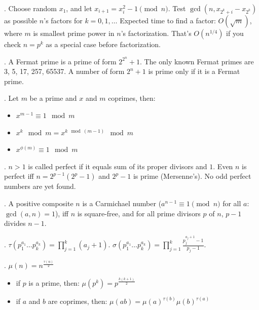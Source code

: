 .
Choose random $x_1$, and let $x_{i+1} = x_i^2 - 1 \pmod{n}$.
Test $\gcd(n, x_{2^k+i} - x_{2^k})$ as possible $n$'s factors for $k=0,1,\ldots$
Expected time to find a factor: $O(\sqrt{m})$, where $m$ is smallest
prime power in $n$'s factorization.
That's $O(n^{1/4})$ if you check $n = p^k$ as a special case before factorization.

.  A Fermat prime is a prime of form $2^{2^n}+1$.
The only known Fermat primes are 3, 5, 17, 257, 65537.
A number of form $2^n+1$ is prime only if it is a Fermat prime.


. Let $m$ be a prime and $x$ and $m$ coprimes, then:
\begin{itemize}
\item $x^{m-1} \equiv 1 \mod m $
\item $x^{k} \mod m = x^{k \mod (m-1)} \mod m$
\item $x^{\phi(m)} \equiv 1 \mod m $
\end{itemize}


.  $n>1$ is called perfect if it equals
sum of its proper divisors and $1$.  Even $n$ is perfect iff $n = 2^{p-1} (2^p - 1)$
and $2^p - 1$ is prime (Mersenne's). No odd perfect numbers are yet found.

.
A positive composite $n$ is a Carmichael number
($a^{n-1} \equiv 1 \pmod{n}$ for all $a$: $\gcd(a,n)=1$),
iff $n$ is square-free, and for all prime divisors $p$ of $n$, $p-1$ divides $n-1$.

.
$\tau(p_1^{a_1} \dots p_k^{a_k}) = \prod_{j=1}^k (a_j+1)$. \quad
$\sigma(p_1^{a_1} \dots p_k^{a_k}) = \prod_{j=1}^k \frac{p_j^{a_j+1}-1}{p_j-1}$.

.
$\mu(n) = n^{\frac{\tau(n)}{2}}$
\begin{itemize}
\item if $p$ is a prime, then: $\mu(p^k) = p^{\frac{k(k+1)}{2}}$
\item if $a$ and $b$ are coprimes, then: $\mu(ab) = \mu(a)^{\tau(b)}\mu(b)^{\tau(a)}$
\end{itemize}

